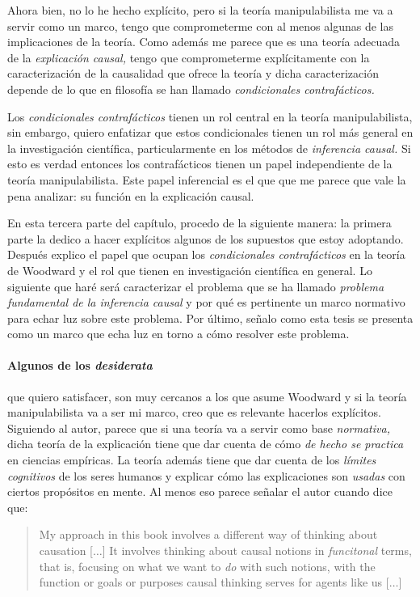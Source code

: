 {{{Ahora bien, no lo he hecho explícito, pero si la teoría
manipulabilista me va a servir como un marco, tengo que
comprometerme con al menos algunas de las implicaciones de
la teoría. Como además me parece que es una teoría adecuada
de la \emph{explicación causal,} tengo que comprometerme
explícitamente con la caracterización de la causalidad que
ofrece la teoría y dicha caracterización depende de lo que
en filosofía se han llamado \emph{condicionales
contrafácticos.}

Los \emph{condicionales contrafácticos} tienen un rol
central en la teoría manipulabilista, sin embargo, quiero
enfatizar que estos condicionales tienen un rol más general
en la investigación científica, particularmente en los
métodos de \emph{inferencia causal.} Si esto es verdad
entonces los contrafácticos tienen un papel independiente de
la teoría manipulabilista. Este papel inferencial es el
que que me parece que vale la pena analizar: su función
en la explicación causal.

En esta tercera parte del capítulo, procedo de la siguiente
manera: la primera parte la dedico a hacer explícitos
algunos de los supuestos que estoy adoptando. Después explico el papel que
ocupan los \emph{condicionales contrafácticos} en la teoría
de Woodward y el rol que tienen en investigación científica
en general. Lo siguiente que haré será caracterizar el
problema que se ha llamado \emph{problema fundamental de la
inferencia causal} y por qué es pertinente un marco
normativo para echar luz sobre este problema. Por último, señalo como esta tesis se presenta como
un marco que echa luz en torno a cómo resolver este
problema.

\paragraph{Algunos de los \emph{desiderata}} que quiero
satisfacer,  son muy cercanos a los que asume Woodward y si
la teoría manipulabilista va a ser mi marco, creo que es
relevante hacerlos explícitos. Siguiendo al autor, parece
que si una teoría va a servir como base \emph{normativa,}
dicha teoría de la explicación tiene que dar cuenta de cómo
\emph{de hecho se practica} en ciencias empíricas. La teoría
además tiene que dar cuenta de los \emph{límites cognitivos}
de los seres humanos y explicar cómo las explicaciones son
\emph{usadas} con ciertos propósitos en mente. Al menos eso
parece señalar el autor cuando dice que:

\begin{quote}
  My approach in this book involves a different way of
  thinking about causation [$\ldots$] It involves thinking
  about causal notions in \emph{funcitonal} terms, that is,
  focusing on what we want to \emph{do} with such notions,
  with the function or goals or purposes causal thinking
  serves for agents like us [$\ldots$] %
\end{quote}


}}}
